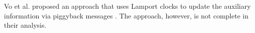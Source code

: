 Vo et al. proposed an approach that uses Lamport clocks to update the auxiliary information via piggyback messages \cite{DBLP:conf/sc/VoAGSSB10,DBLP:conf/IEEEpact/VoGKSSB11}. The approach, however, is not complete in their analysis.


